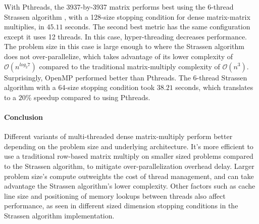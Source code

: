 \documentclass{article}
\begin{document}
With Pthreads, the 3937-by-3937 matrix performs best using the 6-thread Strassen algorithm , with a 128-size stopping condition for dense matrix-matrix multiplies, in $45.11$ seconds. The second best metric has the same configuration except it uses 12 threads. In this case, hyper-threading decreases performance. The problem size in this case is large enough to where the Strassen algorithm does not over-parallelize, which takes advantage of its lower complexity of $\mathcal{O}(n^{log_{2}{7}})$ compared to the traditional matrix-multiply complexity of $\mathcal{O}(n^3)$. \\

Surprisingly, OpenMP performed better than Pthreads. The 6-thread Strassen algorithm with a 64-size stopping condition took $38.21$ seconds, which translates to a $20\%$ speedup compared to using Pthreads.

\paragraph{Conclusion}
Different variants of multi-threaded dense matrix-multiply perform better depending on the problem size and underlying architecture. It's more efficient to use a traditional row-based matrix multiply on smaller sized problems compared to the Strassen algorithm, to mitigate over-parallelization overhead delay. Larger problem size's compute outweights the cost of thread management, and can take advantage the Strassen algorithm's lower complexity. Other factors such as cache line size and positioning of memory lookups between threads also affect performance, as seen in different sized dimension stopping conditions in the Strassen algorithm implementation.
\end{document}
